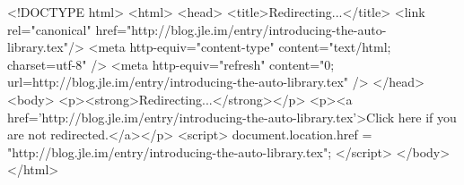 <!DOCTYPE html>
<html>
<head>
<title>Redirecting...</title>
<link rel="canonical" href="http://blog.jle.im/entry/introducing-the-auto-library.tex"/>
<meta http-equiv="content-type" content="text/html; charset=utf-8" />
<meta http-equiv="refresh" content="0; url=http://blog.jle.im/entry/introducing-the-auto-library.tex" />
</head>
<body>
  <p><strong>Redirecting...</strong></p>
  <p><a href='http://blog.jle.im/entry/introducing-the-auto-library.tex'>Click here if you are not redirected.</a></p>
  <script>
    document.location.href = "http://blog.jle.im/entry/introducing-the-auto-library.tex";
  </script>
</body>
</html>
